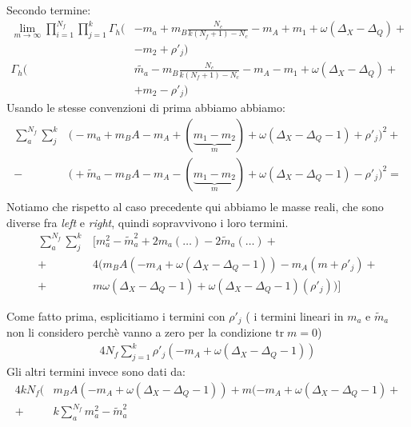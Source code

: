 \documentclass[a4paper,12pt]{article}
\begin{document}
Secondo termine:
\begin{align*}
\lim_{m \rightarrow \infty} \prod_{i=1}^{N_f} \prod_{j=1}^{k } \Gamma_h \big(& - m_a + m_B \frac{N_c}{k(N_f+1)-N_c }- m_A + m_1 + \omega ( \Delta_X - \Delta_Q)+\\
&  - m_2  + \rho'_j \big) \\
\Gamma_h \big( & \tilde{m_a} - m_B \frac{N_c}{k(N_f+1)-N_c }- m_A - m_1 + \omega ( \Delta_X - \Delta_Q) +\\
& + m_2 - \rho'_j \big)
\end{align*}
Usando le stesse convenzioni di prima abbiamo abbiamo:
\begin{align*}
\sum_a^{N_f} \sum_j^{k} &  \big(  - m_a + m_B A - m_A + (\underbrace{m_1 - m_2}_{m}) + \omega ( \Delta_X - \Delta_Q - 1) + \rho'_j \big)^2 +\\
	- &\big(  + \tilde{m}_a - m_B A - m_A - ( \underbrace{m_1 - m_2}_{m})  + \omega ( \Delta_X - \Delta_Q - 1) - \rho'_j \big)^2 = \\
\end{align*}
Notiamo che rispetto al caso precedente qui abbiamo le masse reali, che sono diverse fra \emph{left} e \emph{right}, quindi sopravvivono i loro termini.
\begin{align*}
\sum_a^{N_f} \sum_j^{k} &  \big[  m_a^2 - \tilde{m}_a^2 + 2 m_a ( \dots )  - 2 \tilde{m	}_a ( \dots) + \\
 + &4 \big( m_B A ( - m_A +  \omega ( \Delta_X - \Delta_Q - 1) ) - m_A ( m + \rho'_j)  + \\
+ &  m\omega ( \Delta_X - \Delta_Q - 1)  + \omega ( \Delta_X - \Delta_Q - 1) ( \rho'_j) \big)\big]
\end{align*}

Come fatto prima, esplicitiamo i termini con $\rho'_j$ ( i termini lineari in $m_a$ e $\tilde{m}_a$ non li considero perchè vanno a zero per la condizione $ \mbox{tr}\; m = 0$)
\begin{align*}
 4 N_f \sum_{j=1}^k  \rho'_j ( - m_A +  \omega ( \Delta_X - \Delta_Q - 1) )
\end{align*}
Gli altri termini invece sono dati da:
\begin{align*}
4 k N_f \big(&  m_B A (- m_A +  \omega ( \Delta_X - \Delta_Q - 1)) + m ( - m_A +  \omega ( \Delta_X - \Delta_Q - 1)+ \\
+ &  k \sum_a^{N_f} m_a^2 - \tilde{m}_a^2
\end{align*}
\end{document}
